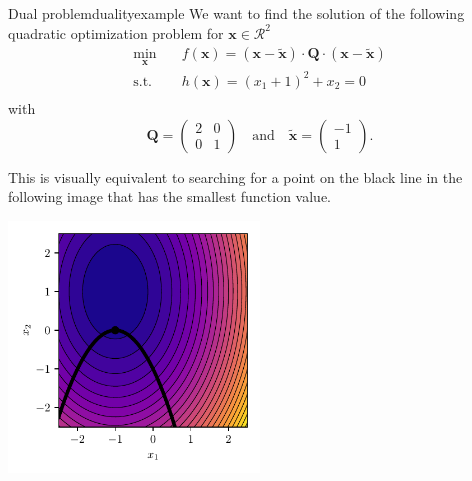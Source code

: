 \begin{example}{Dual problem}{dualityexample}
    We want to find the solution of the following quadratic optimization problem for $\mathbf{x} \in \mathcal{R}^2$
    \begin{equation}
        \begin{aligned}
            \min_{\mathbf{x}} \quad & f(\mathbf{x})= (\mathbf{x}-\tilde{\mathbf{x}}) \cdot \mathbf{Q} \cdot (\mathbf{x}-\tilde{\mathbf{x}})\\
            \textrm{s.t.} \quad     & h(\mathbf{x}) = (x_1+1)^2 + x_2 = 0  \\
        \end{aligned}
    \end{equation}
    with 
    \begin{equation}
        \mathbf{Q} = 
        \begin{pmatrix}
        2 & 0 \\
        0 & 1 
        \end{pmatrix} 
        \quad 
        \text{and}
        \quad
        \tilde{\mathbf{x}} = 
        \begin{pmatrix}
        -1\\
        1 
        \end{pmatrix}.
    \end{equation}

    This is visually equivalent to searching for a point on the black line in the following image that has the smallest function value.
    \begin{center}
        \includegraphics[width=0.5\textwidth]{figures/dual_example.pdf}
    \end{center}


\end{example}
